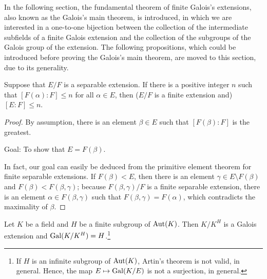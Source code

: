 In the following section, the fundamental theorem of finite Galois's extensions, also known as the Galois's main theorem, is introduced, in which we are interested in a one-to-one bijection between the collection of the intermediate subfields of a finite Galois extension and the collection of the subgroups of the Galois group of the extension.
The following propositions, which could be introduced before proving the Galois's main theorem, are moved to this section, due to its generality.
\begin{prop}\label{maximality_of_primitive_deg_implies_finiteness_of_the_extension}
    Suppose that $E/F$ is a separable extension.
    If there is a positive integer $n$ such that $[F(\alpha): F]\leq n$ for all $\alpha\in E$, then ($E/F$ is a finite extension and) $[E:F]\leq n$. 
\end{prop}
\begin{proof}
    By assumption, there is an element $\beta\in E$ such that $[F(\beta): F]$ is the greatest.
    \begin{center}
        Goal: To show that $E=F(\beta)$.
    \end{center}
    In fact, our goal can easily be deduced from the primitive element theorem for finite separable extensions.
    If $F(\beta)<E$, then there is an element $\gamma\in E\setminus F(\beta)$ and $F(\beta)<F(\beta, \gamma)$; because $F(\beta, \gamma)/F$ is a finite separable extension, there is an element $\alpha\in F(\beta, \gamma)$ such that $F(\beta, \gamma)=F(\alpha)$, which contradicts the maximality of $\beta$.
\end{proof}
\begin{lem}
    Let $K$ be a field and $H$ be a finite subgroup of ${\textrm{Aut}({K})}$.
    Then $K/K^H$ is a Galois extension and ${\textrm{Gal}({K/K^H})}=H$.\footnote{If $H$ is an infinite subgroup of ${\textrm{Aut}({K})}$, Artin's theorem is not valid, in general. Hence, the map $E\mapsto{\textrm{Gal}({K/E})}$ is not a surjection, in general.}
\end{lem}
